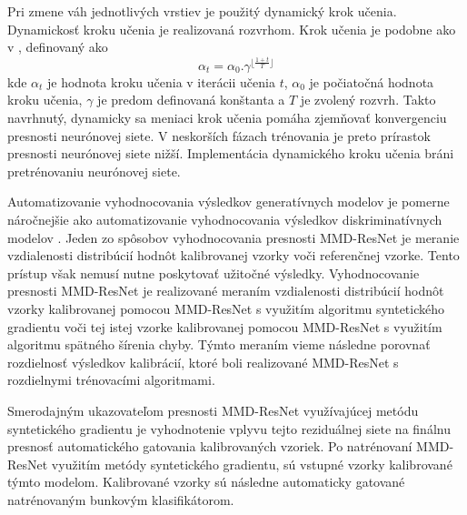 Pri zmene váh jednotlivých vrstiev je použitý dynamický krok učenia. Dynamickosť kroku učenia je realizovaná rozvrhom. Krok učenia je podobne ako v \cite{Li2017}, definovaný ako 
\begin{equation}
\label{dyna_lr}
    \alpha_t = \alpha_0 . \gamma^{\lfloor\frac{1+t}{T}\rfloor}
\end{equation}
kde $\alpha_t$ je hodnota kroku učenia v iterácii učenia $t$, $\alpha_0$ je počiatočná hodnota kroku učenia, $\gamma$ je predom definovaná konštanta a $T$ je zvolený rozvrh. Takto navrhnutý, dynamicky sa meniaci krok učenia pomáha zjemňovať konvergenciu presnosti neurónovej siete. V neskorších fázach trénovania je preto prírastok presnosti neurónovej siete nižší. Implementácia dynamického kroku učenia bráni pretrénovaniu neurónovej siete.

Automatizovanie vyhodnocovania výsledkov generatívnych modelov je pomerne náročnejšie ako automatizovanie vyhodnocovania výsledkov diskriminatívnych modelov \cite{Bethge2016}. Jeden zo spôsobov vyhodnocovania presnosti MMD-ResNet je meranie vzdialenosti distribúcií hodnôt kalibrovanej vzorky voči referenčnej vzorke. Tento prístup však nemusí nutne poskytovať užitočné výsledky. Vyhodnocovanie presnosti MMD-ResNet je realizované meraním vzdialenosti distribúcií hodnôt vzorky kalibrovanej pomocou MMD-ResNet s využitím algoritmu syntetického gradientu voči tej istej vzorke kalibrovanej pomocou MMD-ResNet s využitím algoritmu spätného šírenia chyby. Týmto meraním vieme následne porovnať rozdielnosť výsledkov kalibrácií, ktoré boli realizované MMD-ResNet s rozdielnymi trénovacími algoritmami.

Smerodajným ukazovateľom presnosti MMD-ResNet využívajúcej metódu syntetického gradientu je vyhodnotenie vplyvu tejto reziduálnej siete na finálnu presnosť automatického gatovania kalibrovaných vzoriek. Po natrénovaní MMD-ResNet využitím metódy syntetického gradientu, sú vstupné vzorky kalibrované týmto modelom. Kalibrované vzorky sú následne automaticky gatované natrénovaným bunkovým klasifikátorom.

